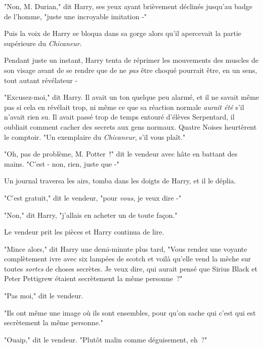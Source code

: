 "Non, M. Durian," dit Harry, ses yeux ayant brièvement déclinés jusqu'au badge de l'homme, "juste une incroyable imitation -"

Puis la voix de Harry se bloqua dans sa gorge alors qu'il apercevait la partie supérieure du \emph{Chicaneur}.

Pendant juste un instant, Harry tenta de réprimer les mouvements des muscles de son visage avant de se rendre que de ne \emph{pas} être choqué pourrait être, en un sens, tout autant révélateur -

"Excusez-moi," dit Harry. Il avait un ton quelque peu alarmé, et il ne savait même pas si cela en révélait trop, ni même ce que sa réaction normale \emph{aurait été} s'il n'avait rien su. Il avait passé trop de temps entouré d'élèves Serpentard, il oubliait comment cacher des secrets aux gens normaux. Quatre Noises heurtèrent le comptoir. "Un exemplaire du \emph{Chicaneur}, s'il vous plaît."

"Oh, pas de problème, M. Potter~!" dit le vendeur avec hâte en battant des mains. "C'est - non, rien, juste que -"

Un journal traversa les airs, tomba dans les doigts de Harry, et il le déplia.


"C'est gratuit," dit le vendeur, "pour \emph{vous}, je veux dire -"

"Non," dit Harry, "j'allais en acheter un de toute façon."

Le vendeur prit les pièces et Harry continua de lire.

"Mince alors," dit Harry une demi-minute plus tard, "Vous rendez une voyante complètement ivre avec six lampées de scotch et voilà qu'elle vend la mèche sur toutes \emph{sortes} de choses secrètes. Je veux dire, qui aurait pensé que Sirius Black et Peter Pettigrew étaient secrètement la même personne~?"

"Pas moi," dit le vendeur.

"Ils ont même une image où ils sont ensembles, pour qu'on sache qui c'est qui est secrètement la même personne."

"Ouaip," dit le vendeur. "Plutôt malin comme déguisement, eh~?"

